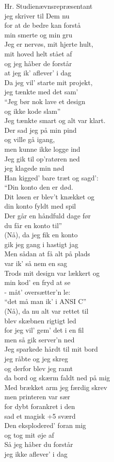 Hr. Studienævnsrepræsentant\\
jeg skriver til Dem nu\\
for at de bedre kan forstå\\
min smerte og min gru\\
Jeg er nervøs, mit hjerte hult,\\
mit hoved helt stået af\\
og jeg håber de forstår\\
at jeg ik' aflever' i dag\\

Da jeg vil' starte mit projekt,\\
jeg tænkte med det sam'\\
``Jeg bør nok lave et design\\
og ikke kode slam''\\
Jeg tænkte smart og alt var klart.\\
Der sad jeg på min pind\\
og ville gå igang,\\
men kunne ikke logge ind\\

Jeg gik til op'ratøren ned\\
jeg klagede min nød\\
Han kigged' bare træt og sagd':\\
``Din konto den er død.\\
Dit løsen er blev't knækket og\\
din konto fyldt med spil\\
Der går en håndfuld dage før\\
du får en konto til''\\

(Nå), da jeg fik en konto\\
gik jeg gang i hastigt jag\\
Men sådan at få alt på plads\\
var ik' så nem en sag\\
Trods mit design var lækkert og\\
min kod' en fryd at se\\
- måt' oversætter'n le:\\
``det må man ik' i ANSI C''\\

(Nå), da nu alt var rettet til\\
blev skæbnen rigtigt led\\
for jeg vil' gem' det i en fil\\
men så gik server'n ned\\
Jeg sparkede hårdt til mit bord\\
jeg råbte og jeg skreg\\
og derfor blev jeg ramt\\
da bord og skærm faldt ned på mig\\

Med brækket arm jeg færdig skrev\\
men printeren var sær\\
for dybt forankret i den\\
sad et magisk +5 sværd\\
Den eksplodered' foran mig\\
og tog mit øje af\\
Så jeg håber du forstår\\
jeg ikke aflever' i dag\\
